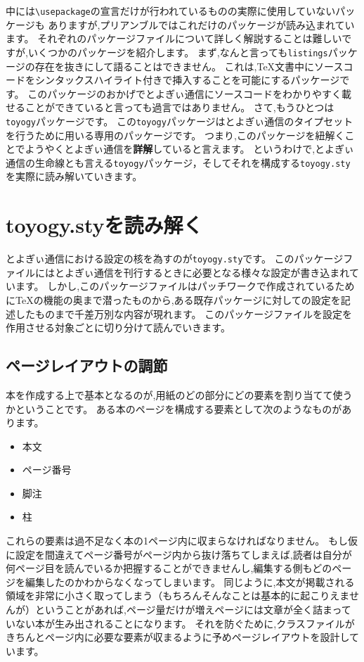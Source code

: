 中には\verb|\usepackage|の宣言だけが行われているものの実際に使用していないパッケージも
ありますが,プリアンブルではこれだけのパッケージが読み込まれています。
それぞれのパッケージファイルについて詳しく解説することは難しいですが,いくつかのパッケージを紹介します。
まず,なんと言っても\verb|listings|パッケージの存在を抜きにして語ることはできません。
これは,{\TeX}文書中にソースコードをシンタックスハイライト付きで挿入することを可能にするパッケージです。
このパッケージのおかげでとよぎぃ通信にソースコードをわかりやすく載せることができていると言っても過言ではありません。
さて,もうひとつは\verb|toyogy|パッケージです。
この\verb|toyogy|パッケージはとよぎぃ通信のタイプセットを行うために用いる専用のパッケージです。
つまり,このパッケージを紐解くことでようやくとよぎぃ通信を\textbf{詳解}していると言えます。
というわけで,とよぎぃ通信の生命線とも言える\verb|toyogy|パッケージ，そしてそれを構成する\verb|toyogy.sty|を実際に読み解いていきます。

\section{toyogy.styを読み解く}

とよぎぃ通信における設定の核を為すのが\texttt{toyogy.sty}です。
このパッケージファイルにはとよぎぃ通信を刊行するときに必要となる様々な設定が書き込まれています。
しかし,このパッケージファイルはパッチワークで作成されているために{\TeX}の機能の奥まで潜ったものから,ある既存パッケージに対しての設定を記述したものまで千差万別な内容が現れます。
このパッケージファイルを設定を作用させる対象ごとに切り分けて読んでいきます。

\subsection{ページレイアウトの調節}

本を作成する上で基本となるのが,用紙のどの部分にどの要素を割り当てて使うかということです。
ある本のページを構成する要素として次のようなものがあります。

\begin{itemize}
	\item 本文
	\item ページ番号
	\item 脚注
	\item 柱
\end{itemize}

これらの要素は過不足なく本の1ページ内に収まらなければなりません。
もし仮に設定を間違えてページ番号がページ内から抜け落ちてしまえば,読者は自分が何ページ目を読んでいるか把握することができませんし,編集する側もどのページを編集したのかわからなくなってしまいます。
同じように,本文が掲載される領域を非常に小さく取ってしまう（もちろんそんなことは基本的に起こりえませんが）ということがあれば,ページ量だけが増えページには文章が全く詰まっていない本が生み出されることになります。
それを防ぐために,クラスファイルがきちんとページ内に必要な要素が収まるように予めページレイアウトを設計しています。

